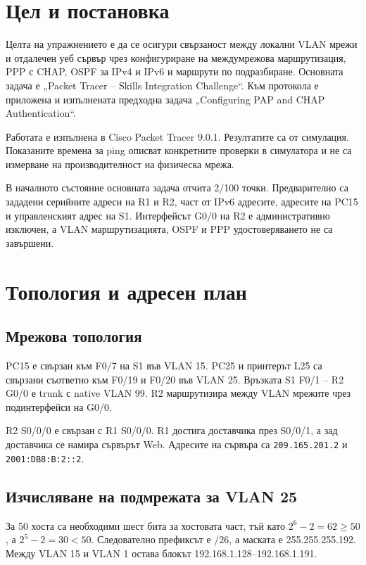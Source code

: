 \documentclass[12pt]{article}
\begin{document}
\section{Цел и постановка}
Целта на упражнението е да се осигури свързаност между локални VLAN мрежи и отдалечен уеб сървър чрез конфигуриране на междумрежова маршрутизация, PPP с CHAP, OSPF за IPv4 и IPv6 и маршрути по подразбиране. Основната задача е „Packet Tracer -- Skills Integration Challenge“. Към протокола е приложена и изпълнената предходна задача „Configuring PAP and CHAP Authentication“.

Работата е изпълнена в Cisco Packet Tracer 9.0.1. Резултатите са от симулация. Показаните времена за ping описват конкретните проверки в симулатора и не са измерване на производителност на физическа мрежа.

В началното състояние основната задача отчита 2/100 точки. Предварително са зададени серийните адреси на R1 и R2, част от IPv6 адресите, адресите на PC15 и управленският адрес на S1. Интерфейсът G0/0 на R2 е административно изключен, а VLAN маршрутизацията, OSPF и PPP удостоверяването не са завършени.

\section{Топология и адресен план}
\subsection{Мрежова топология}
PC15 е свързан към F0/7 на S1 във VLAN 15. PC25 и принтерът L25 са свързани съответно към F0/19 и F0/20 във VLAN 25. Връзката S1 F0/1 -- R2 G0/0 е trunk с native VLAN 99. R2 маршрутизира между VLAN мрежите чрез подинтерфейси на G0/0.

R2 S0/0/0 е свързан с R1 S0/0/0. R1 достига доставчика през S0/0/1, а зад доставчика се намира сървърът Web. Адресите на сървъра са \texttt{209.165.201.2} и \texttt{2001:DB8:B:2::2}.

\subsection{Изчисляване на подмрежата за VLAN 25}
За 50 хоста са необходими шест бита за хостовата част, тъй като $2^6-2=62\geq50$, а $2^5-2=30<50$. Следователно префиксът е /26, а маската е 255.255.255.192. Между VLAN 15 и VLAN 1 остава блокът 192.168.1.128--192.168.1.191.
\end{document}
